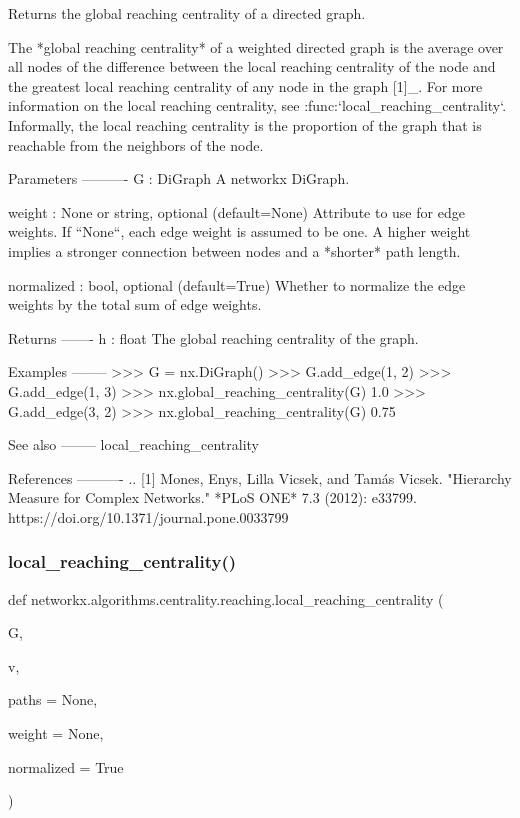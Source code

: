\begin{DoxyVerb}Returns the global reaching centrality of a directed graph.

The *global reaching centrality* of a weighted directed graph is the
average over all nodes of the difference between the local reaching
centrality of the node and the greatest local reaching centrality of
any node in the graph [1]_. For more information on the local
reaching centrality, see :func:`local_reaching_centrality`.
Informally, the local reaching centrality is the proportion of the
graph that is reachable from the neighbors of the node.

Parameters
----------
G : DiGraph
    A networkx DiGraph.

weight : None or string, optional (default=None)
    Attribute to use for edge weights. If ``None``, each edge weight
    is assumed to be one. A higher weight implies a stronger
    connection between nodes and a *shorter* path length.

normalized : bool, optional (default=True)
    Whether to normalize the edge weights by the total sum of edge
    weights.

Returns
-------
h : float
    The global reaching centrality of the graph.

Examples
--------
>>> G = nx.DiGraph()
>>> G.add_edge(1, 2)
>>> G.add_edge(1, 3)
>>> nx.global_reaching_centrality(G)
1.0
>>> G.add_edge(3, 2)
>>> nx.global_reaching_centrality(G)
0.75

See also
--------
local_reaching_centrality

References
----------
.. [1] Mones, Enys, Lilla Vicsek, and Tamás Vicsek.
       "Hierarchy Measure for Complex Networks."
       *PLoS ONE* 7.3 (2012): e33799.
       https://doi.org/10.1371/journal.pone.0033799
\end{DoxyVerb}
 \mbox{\label{namespacenetworkx_1_1algorithms_1_1centrality_1_1reaching_a20413b1f788576335f9598ea582aaec3}} 
\subsubsection{\texorpdfstring{local\+\_\+reaching\+\_\+centrality()}{local\_reaching\_centrality()}}
{\footnotesize\ttfamily def networkx.\+algorithms.\+centrality.\+reaching.\+local\+\_\+reaching\+\_\+centrality (\begin{DoxyParamCaption}\item[{}]{G,  }\item[{}]{v,  }\item[{}]{paths = {\ttfamily None},  }\item[{}]{weight = {\ttfamily None},  }\item[{}]{normalized = {\ttfamily True} }\end{DoxyParamCaption})}

